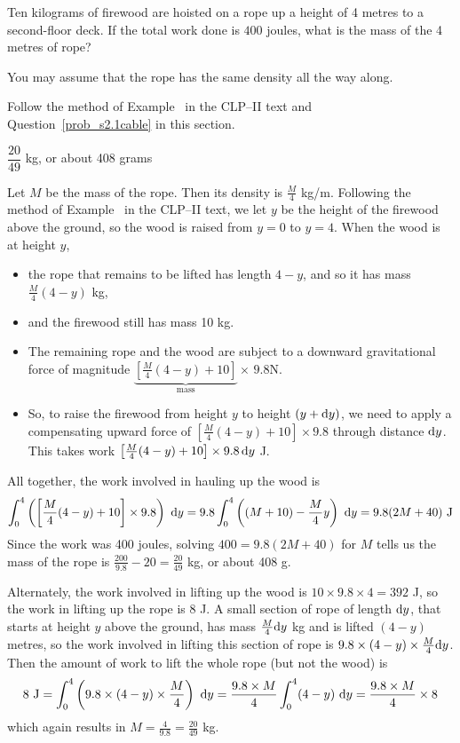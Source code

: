 \begin{Mquestion}\label{prob_s2.1firewood}
Ten kilograms of firewood are hoisted on a rope up a height of 4 metres to a second-floor deck. If
the total work done is $400$ joules, what is the mass of the 4 metres of rope?

You may assume that the rope has the same density all the way along.
\end{Mquestion}
\begin{hint}
Follow the method of Example~ in the CLP--II text and Question~\ref{prob_s2.1cable} in this section.
\end{hint}
\begin{answer}
$\dfrac{20}{49}$ kg, or about 408 grams
\end{answer}
\begin{solution}
Let $M$ be the mass of the rope. Then its density is $\frac{M}{4}$ kg/m. Following the method of Example~ in the CLP--II text, we let $y$ be the height of the firewood above the ground, so the wood is raised from $y=0$ to $y=4$. When the wood is at height $y$,
\begin{itemize}
\item the rope that remains to be lifted has length $4-y$, and so it has mass $\frac{M}{4}(4-y) $ kg,
\item and the firewood still has mass 10 kg.
\item The remaining rope and the wood are subject to a downward gravitational force of magnitude $\underbrace{\left[\frac{M}{4}(4-y)+10\right]}_{\text{mass}}\times\, 9.8$\quad N.
\item So, to raise the firewood from height $y$ to height $(y+\mathrm{d}y)$, we need to apply a compensating upward force of $\left[\frac{M}{4}(4-y)+10\right]\times 9.8$ through distance $\mathrm{d}y$. This takes work $\left[\frac{M}{4}(4-y)+10\right]\times 9.8\,\mathrm{d}y$ J.
\end{itemize}
All together, the work involved in hauling up the wood is
\[\int_0^4\left(\left[\frac{M}{4}(4-y)+10\right]\times 9.8\right)\ \mathrm{d}y =
9.8\int_0^4\left((M+10) - \frac{M}{4}y\right)\ \mathrm{d}y=9.8(2M+40) \text{ J}\]
Since the work was 400 joules, solving $400=9.8(2M+40)$ for $M$ tells us the mass of the rope is $\frac{200}{9.8}-20 = \frac{20}{49}$ kg, or about 408 g.

Alternately, the work involved in lifting up the wood is $10\times 9.8 \times 4 = 392$ J, so the work in lifting up the rope is 8 J. A small section of rope of length $\mathrm{d}y$, that starts at height $y$ above the ground, has mass $\frac{M}{4}\mathrm{d}y$ kg and is lifted $(4-y)$ metres, so the work involved in lifting this section of rope is $9.8 \times (4-y) \times \frac{M}{4}\mathrm{d}y$. Then the amount of work to lift the whole rope (but not the wood) is
\[8 \text{ J} = \int_0^4 \left(9.8 \times (4-y) \times \frac{M}{4}\right)\ \mathrm{d}y  = \frac{9.8 \times M}{4}\int_0^4 (4-y)\ \mathrm{d}y = \frac{9.8 \times M}{4}\times 8\]
which again results in $M = \frac{4}{9.8}=\frac{20}{49}$ kg.
\end{solution}


